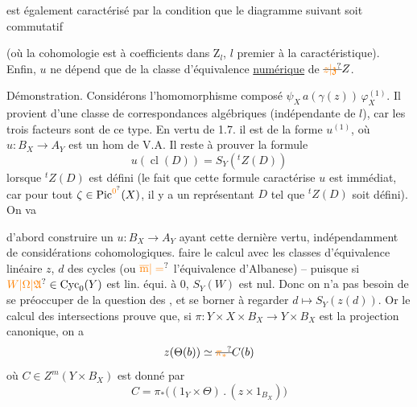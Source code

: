 est également caractérisé par la condition que le diagramme suivant soit commutatif


(où la cohomologie est à coefficients dans $\mathrm{Z}_l$, $l$ premier à la caractéristique). Enfin, $u$ ne dépend que de la classe d'équivalence \uline{numérique} de $\deleted{\unsure{z|\mathfrak{z}}}Z$.

Démonstration. Considérons l'homomorphisme composé $\psi_X\,a(\gamma(z))\,\varphi_X^{(1)}$. Il provient d'une classe de  correspondances algébriques (indépendante de $l$), car les trois facteurs sont de ce type. En vertu de 1.7. il est de la forme $u^{(1)}$, où $u:B_X\longrightarrow A_Y$ est un hom de V.A. Il reste à prouver la formule
\[
u(\operatorname{cl}(D))=S_Y({}^tZ(D))
\]
lorsque $ {}^tZ(D)$ est défini (le fait que cette formule caractérise $u$ est immédiat, car pour tout $\zeta\in\operatorname{Pic}^{\unsure{0}}(X)$, il y a un représentant $D$ tel que $ {}^tZ(D)$ soit défini). On va

d'abord construire un $u:B_X\longrightarrow A_Y$ ayant cette dernière vertu, indépendamment de considérations cohomologiques.  faire le calcul avec les classes d'équivalence linéaire $z$, $d$ des cycles (ou $\unsure{\overline{\mathrm m}|=}$ l'équivalence d'Albanese) -- puisque si $\unsure{W|\Omega|\mathfrak{A}}\in\operatorname{Cyc}_0(Y)$ est lin. équi. à $0$, $S_Y(W)$ est nul. Donc on n'a pas besoin de se préoccuper de la question  des , et se borner à regarder $d\longmapsto S_Y(z(d))$. Or le calcul des intersections prouve que, si $\pi:Y\times X\times B_X\longrightarrow Y\times B_X$ est la projection canonique,  on a 
\[
z(\Theta(b))\simeq\deleted{\unsure{\pi_*}}C(b)
\]
où $C\in Z^m(Y\times B_X)$ est donné par
\[
C=\pi_*\bigl((1_Y\times\Theta)\mathbin{.}(z\times1_{B_X})\bigr)
\]

